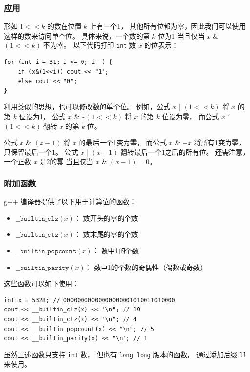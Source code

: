 \subsubsection{应用}

形如 $1 < < k$ 的数在位置 $k$ 上有一个1，
其他所有位都为零，因此我们可以使用这样的数来访问单个位。
具体来说，一个数的第 $k$ 位为1
当且仅当 $x$ \& $(1 < < k)$ 不为零。
以下代码打印 \texttt{int} 数 $x$ 的位表示：

\begin{lstlisting}
for (int i = 31; i >= 0; i--) {
    if (x&(1<<i)) cout << "1";
    else cout << "0";
}
\end{lstlisting}

利用类似的思想，也可以修改数的单个位。
例如，公式 $x$ | $(1 < < k)$
将 $x$ 的第 $k$ 位设为1，
公式
$x$ \& \textasciitilde $(1 < < k)$
将 $x$ 的第 $k$ 位设为零，
而公式
$x$ $\XOR$ $(1 < < k)$
翻转 $x$ 的第 $k$ 位。

公式 $x$ \& $(x-1)$ 将 $x$ 的最后一个1变为零，
而公式 $x$ \& $-x$ 将所有1变为零，
只保留最后一个1。
公式 $x$ | $(x-1)$
翻转最后一个1之后的所有位。
还需注意，一个正数 $x$ 是2的幂
当且仅当 $x$ \& $(x-1) = 0$。

\subsubsection*{附加函数}

g++ 编译器提供了以下用于计算位的函数：

\begin{itemize}
\item
$\texttt{\_\_builtin\_clz}(x)$：
数开头的零的个数
\item
$\texttt{\_\_builtin\_ctz}(x)$：
数末尾的零的个数
\item
$\texttt{\_\_builtin\_popcount}(x)$：
数中1的个数
\item
$\texttt{\_\_builtin\_parity}(x)$：
数中1的个数的奇偶性（偶数或奇数）
\end{itemize}
\begin{samepage}

这些函数可以如下使用：
\begin{lstlisting}
int x = 5328; // 00000000000000000001010011010000
cout << __builtin_clz(x) << "\n"; // 19
cout << __builtin_ctz(x) << "\n"; // 4
cout << __builtin_popcount(x) << "\n"; // 5
cout << __builtin_parity(x) << "\n"; // 1
\end{lstlisting}
\end{samepage}

虽然上述函数只支持 \texttt{int} 数，
但也有 \texttt{long long} 版本的函数，
通过添加后缀 \texttt{ll} 来使用。

